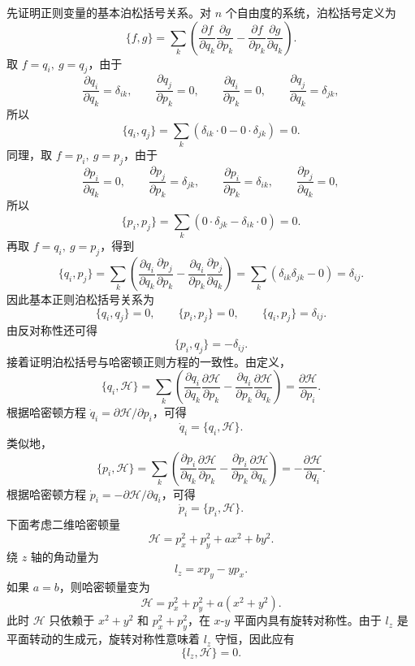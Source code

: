 \begin{solution}[正则泊松括号关系]
\answer
先证明正则变量的基本泊松括号关系。对 \(n\) 个自由度的系统，泊松括号定义为
\[
\{f,g\}=\sum_k\left(\frac{\partial f}{\partial q_k}\frac{\partial g}{\partial p_k}-\frac{\partial f}{\partial p_k}\frac{\partial g}{\partial q_k}\right).
\]
取 \(f=q_i,\ g=q_j\)，由于
\[
\frac{\partial q_i}{\partial q_k}=\delta_{ik},\qquad
\frac{\partial q_j}{\partial p_k}=0,\qquad
\frac{\partial q_i}{\partial p_k}=0,\qquad
\frac{\partial q_j}{\partial q_k}=\delta_{jk},
\]
所以
\[
\{q_i,q_j\}
=\sum_k(\delta_{ik}\cdot 0-0\cdot\delta_{jk})=0.
\]
同理，取 \(f=p_i,\ g=p_j\)，由于
\[
\frac{\partial p_i}{\partial q_k}=0,\qquad
\frac{\partial p_j}{\partial p_k}=\delta_{jk},\qquad
\frac{\partial p_i}{\partial p_k}=\delta_{ik},\qquad
\frac{\partial p_j}{\partial q_k}=0,
\]
所以
\[
\{p_i,p_j\}
=\sum_k(0\cdot\delta_{jk}-\delta_{ik}\cdot 0)=0.
\]
再取 \(f=q_i,\ g=p_j\)，得到
\[
\{q_i,p_j\}
=
\sum_k\left(
\frac{\partial q_i}{\partial q_k}\frac{\partial p_j}{\partial p_k}
-
\frac{\partial q_i}{\partial p_k}\frac{\partial p_j}{\partial q_k}
\right)
=
\sum_k(\delta_{ik}\delta_{jk}-0)
=
\delta_{ij}.
\]
因此基本正则泊松括号关系为
\[
\{q_i,q_j\}=0,\qquad
\{p_i,p_j\}=0,\qquad
\{q_i,p_j\}=\delta_{ij}.
\]
由反对称性还可得
\[
\{p_i,q_j\}=-\delta_{ij}.
\]
接着证明泊松括号与哈密顿正则方程的一致性。由定义，
\[
\{q_i,\mathcal H\}
=
\sum_k\left(
\frac{\partial q_i}{\partial q_k}\frac{\partial\mathcal H}{\partial p_k}
-
\frac{\partial q_i}{\partial p_k}\frac{\partial\mathcal H}{\partial q_k}
\right)
=
\frac{\partial \mathcal H}{\partial p_i}.
\]
根据哈密顿方程 \(\dot q_i=\partial\mathcal H/\partial p_i\)，可得
\[
\dot q_i=\{q_i,\mathcal H\}.
\]
类似地，
\[
\{p_i,\mathcal H\}
=
\sum_k\left(
\frac{\partial p_i}{\partial q_k}\frac{\partial\mathcal H}{\partial p_k}
-
\frac{\partial p_i}{\partial p_k}\frac{\partial\mathcal H}{\partial q_k}
\right)
=
-\frac{\partial \mathcal H}{\partial q_i}.
\]
根据哈密顿方程 \(\dot p_i=-\partial\mathcal H/\partial q_i\)，可得
\[
\dot p_i=\{p_i,\mathcal H\}.
\]
下面考虑二维哈密顿量
\[
\mathcal H=p_x^2+p_y^2+ax^2+by^2.
\]
绕 \(z\) 轴的角动量为
\[
l_z=xp_y-yp_x.
\]
如果 \(a=b\)，则哈密顿量变为
\[
\mathcal H=p_x^2+p_y^2+a(x^2+y^2).
\]
此时 \(\mathcal H\) 只依赖于 \(x^2+y^2\) 和 \(p_x^2+p_y^2\)，在 \(x\)-\(y\) 平面内具有旋转对称性。由于 \(l_z\) 是平面转动的生成元，旋转对称性意味着 \(l_z\) 守恒，因此应有
\[
\{l_z,\mathcal H\}=0.
\]
\end{solution}
